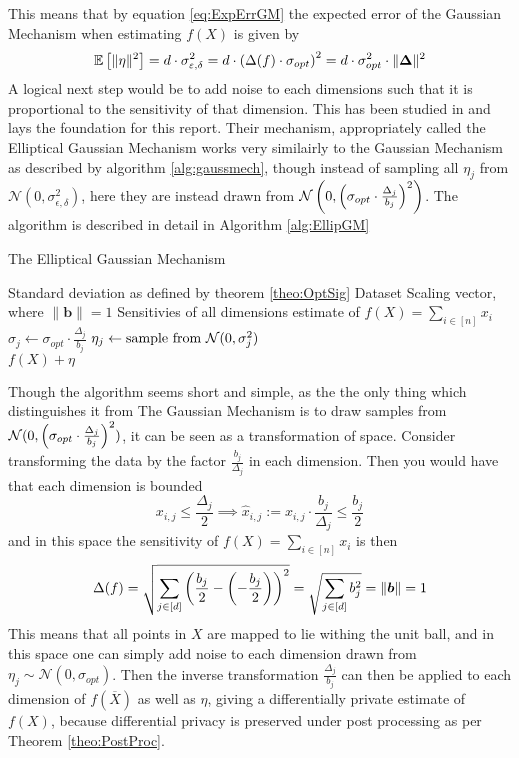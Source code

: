 \documentclass[a4paper,12pt]{article}
\newcommand{\Desc}[2]{\State \makebox[6em][l]{#1}#2}
\begin{document}
\noindent This means that by equation \ref{eq:ExpErrGM} the expected error of the Gaussian Mechanism when estimating $f(X)$ is given by
\begin{equation}
\label{eq:GMErr}
    \mathbb{E} \left [ \| \eta \|^2 \right] = d \cdot \sigma_{\varepsilon, \delta}^2 = d \cdot \left (\Delta(f) \cdot \sigma_{opt}\right)^2 =
    d  \cdot \sigma_{opt}^2 \cdot \| \bm{\Delta} \|^2 
\end{equation}
A logical next step would be to add noise to each dimensions such that it is proportional to the sensitivity of that dimension.
This has been studied in \cite{Lebeda2022} and lays the foundation for this report. Their mechanism, appropriately called the Elliptical Gaussian Mechanism
works very similairly to the Gaussian Mechanism as described by algorithm \ref{alg:gaussmech}, though instead of sampling all $\eta_j$ from 
$\mathcal{N}(0,\sigma_{\epsilon, \delta}^2)$, here they are instead drawn from $\mathcal{N}\left (0,\left (\sigma_{opt}\cdot \frac{\Delta_j}{b_j}\right)^2\right)$. 
The algorithm is described in detail in Algorithm \ref{alg:EllipGM}

\begin{algorithm}
\caption{The Elliptical Gaussian Mechanism}\label{alg:EllipGM}
\begin{algorithmic}
    \Input
    \Desc{$\sigma_{opt}$}{Standard deviation as defined by theorem \ref{theo:OptSig}}
    \Desc{$X \in \R^{n \times d}$}{Dataset}
    \Desc{$\bm{b} \in \R^{d}$}{Scaling vector, where $\|\bm{b}\| = 1$}
    \Desc{$\bm{\Delta} \in \R^{d}$}{Sensitivies of all dimensions}
    \EndInput
    \Output
    \State \edp estimate of $f(X) = \sum_{i \in [n]} x_i$
    \EndOutput
        \State $\sigma_j \gets \sigma_{opt} \cdot \frac{\Delta_j}{b_j}$
        \State $\eta_j \gets \textnormal{sample from } \mathcal{N}(0, \sigma_j^2)$
    \EndFor \\
    \Return $f(X) + \eta$
\end{algorithmic}
\end{algorithm}

Though the algorithm seems short and simple, as the the only thing which distinguishes it from The Gaussian Mechanism 
is to draw samples from $\mathcal{N}(0, \left (\sigma_{opt} \cdot \frac{\Delta_j}{b_j}\right)^2)$, 
it can be seen as a transformation of space. Consider transforming the data by the factor $\frac{b_j}{\Delta_j}$ in each dimension. 
Then you would have that each dimension is bounded
\[
    x_{i,j} \le \frac{\Delta_j}{2} \implies \widehat{x}_{i,j} := x_{i,j} \cdot \frac{b_j}{\Delta_j} \le \frac{b_j}{2}
\]
and in this space the sensitivity of $f(X)= \sum_{i \in [n]} x_i$ is then
\[
    \Delta(f) = \sqrt{\sum_{j \in [d]}\left (\frac{b_j}{2} - \left (-\frac{b_j}{2}\right)\right)^2} = \sqrt{\sum_{j \in [d]} b_j^2} = \|\bm{b}\| =  1
\]
This means that all points in $X$ are mapped to lie withing the unit ball, and in this space one can simply add noise to each 
dimension drawn from $\eta_j \sim \mathcal{N}(0, \sigma_{opt})$. Then the inverse transformation $\frac{\Delta_j}{b_j}$ 
can then be applied to each dimension of $f(\overline{X})$ as well as $\eta$, giving a differentially private estimate of $f(X)$, 
because differential privacy is preserved under post processing as per Theorem \ref{theo:PostProc}. \\
\end{document}
